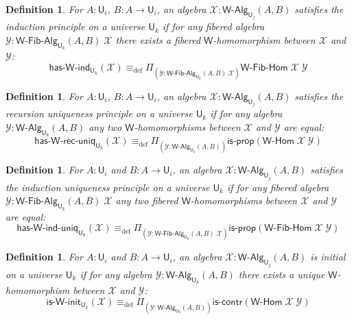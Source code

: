 \documentclass[reqno,10pt,a4paper,oneside]{amsart}
\numberwithin{equation}{section}
\theoremstyle{mythm}
\theoremstyle{mydef}
\newtheorem{definition}[theorem]{Definition}
\theoremstyle{myrmk}
\newcommand{\deq}{\equiv}
\newcommand{\defeq}{\deq_{\mathrm{def}}}
\newcommand{\iscontr}{\mathsf{is}\text{-}\mathsf{contr}}
\newcommand{\isprop}{\mathsf{is}\text{-}\mathsf{prop}}
\newcommand{\prd}[1]{\Pi_{#1}}
\newcommand{\W}{\mathsf{W}}
\newcommand{\UU}{\mathsf{U}}
\newcommand{\WAlg}{\mathsf{W}\text{-}\mathsf{Alg}}
\newcommand{\WFibAlg}{\mathsf{W}\text{-}\mathsf{Fib}\text{-}\mathsf{Alg}}
\newcommand{\WHom}{\mathsf{W}\text{-}\mathsf{Hom}}
\newcommand{\WFibHom}{\mathsf{W}\text{-}\mathsf{Fib}\text{-}\mathsf{Hom}}
\newcommand{\HasWInd}{\mathsf{has}\text{-}\mathsf{W}\text{-}\mathsf{ind}}
\newcommand{\HasWRecUniq}{\mathsf{has}\text{-}\mathsf{W}\text{-}\mathsf{rec}\text{-}\mathsf{uniq}}
\newcommand{\HasWIndUniq}{\mathsf{has}\text{-}\mathsf{W}\text{-}\mathsf{ind}\text{-}\mathsf{uniq}}
\newcommand{\IsWInit}{\mathsf{is}\text{-}\mathsf{\W}\text{-}\mathsf{init}}
\newcommand{\X}{\mathcal{X}}
\newcommand{\Y}{\mathcal{Y}}
\begin{document}
\begin{definition}\label{def:WInd}
For $A:\UU_i$, $B : A \to \UU_i$, an algebra $\X : \WAlg_{\UU_j}(A,B)$ \emph{satisfies the induction principle} on a universe $\UU_k$ if for any fibered algebra $\Y : \WFibAlg_{\UU_k}(A,B) \; \X$ there exists a fibered $\W$-homomorphism between $\X$ and $\Y$:
\[ \HasWInd_{\UU_k}(\X) \defeq \prd{(\Y:\WFibAlg_{\UU_k}(A,B) \; \X)} \WFibHom \; \X \; \Y \]
\end{definition}

\begin{definition}\label{def:WRecUniq}
For $A:\UU_i$, $B : A \to \UU_i$, an algebra $\X : \WAlg_{\UU_j}(A,B)$ \emph{satisfies the recursion uniqueness principle} on a universe $\UU_k$ if for any algebra $\Y : \WAlg_{\UU_k}(A,B)$
any two $\W$-homomorphisms between $\X$ and $\Y$ are equal:
\[ \HasWRecUniq_{\UU_k}(\X) \defeq \prd{(\Y:\WAlg_{\UU_k}(A,B))} \isprop(\WHom \; \X \; \Y) \]
\end{definition}

\begin{definition}\label{def:WIndUniq}
For $A:\UU_i$ and $B : A \to \UU_i$, an algebra $\X : \WAlg_{\UU_j}(A,B)$ \emph{satisfies the induction uniqueness principle} on a universe $\UU_k$ if for any fibered algebra $\Y : \WFibAlg_{\UU_k}(A,B) \; \X$ any two fibered $\W$-homomorphisms between $\X$ and $\Y$ are equal:
\[ \HasWIndUniq_{\UU_k}(\X) \defeq \prd{(\Y:\WFibAlg_{\UU_k}(A,B) \; \X)} \isprop(\WFibHom \; \X \; \Y) \]
\end{definition}

\begin{definition}\label{def:WInit}
For $A:\UU_i$ and $B : A \to \UU_i$, an algebra $\X : \WAlg_{\UU_j}(A,B)$ is \emph{initial} on a universe $\UU_k$ if for any algebra $\Y : \WAlg_{\UU_k}(A,B)$ there exists a unique $\W$-homomorphism between $\X$ and $\Y$:
\[ \IsWInit_{\UU_k}(\X) \defeq \prd{(\Y:\WAlg_{\UU_k}(A,B))} \iscontr(\WHom \; \X \; \Y) \]  
\end{definition}

\end{document}
